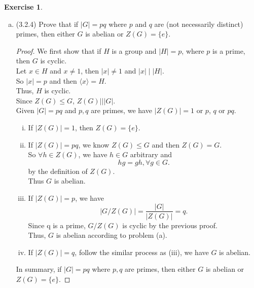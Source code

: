 \documentclass[14pt]{amsart}
\theoremstyle{plain}
\theoremstyle{definition}
\newtheorem{exer}[lem]{Exercise}
\begin{document}
\begin{exer}
\begin{enumerate}[(a)]
\item (3.2.4) Prove that if $|G|=pq$ where $p$ and $q$ are (not necessarily distinct) primes, then either $G$ is abelian or $Z(G)=\{e\}$.
  \begin{proof}
	We first show that if $H$ is a group and $|H| = p$, where $p$ is a prime, then $G$ is cyclic.\\
	Let $x \in H$ and $x \neq 1$, then $|x| \neq 1$ and $|x| \mid |H|$.\\
	So $|x| = p$ and then $\langle x\rangle = H$. \\
	Thus, $H$ is cyclic.\\
	Since $Z(G) \leq G$, $Z(G)| \mid |G|$.\\
	Given $|G| =pq$ and $p,q$ are primes, we have
	$|Z(G)| = 1$ or $p$, $q$ or $pq$.
	\begin{enumerate}[(i)]
	  \item If $|Z(G)| = 1$, then $Z(G) = \{e\}$.
	  \item If $|Z(G)| = pq$, we know $Z(G) \leq G$ and then $Z(G) = G$.\\ 
		So $\forall h\in Z(G)$, we have $h \in G$ arbitrary and  
	  	\[ hg= gh,\forall g \in G.\] 
		by the definition of $Z(G)$.\\
		Thus $G$ is abelian.
	  \item
		If $|Z(G)| = p$, we have 
		\[|G/Z(G)| = \frac{|G|}{|Z(G)|} = q.\]
		Since q is a prime, $G/Z(G)$ is cyclic by the previous proof.\\
		Thus, $G$ is abelian according to problem (a).
 	  \item 
		If $|Z(G)| = q$, follow the similar process as (iii), we have $G$ is abelian.
	\end{enumerate}
		In summary, if $|G| = pq$ where $p,q$ are primes, then either $G$ is abelian or $Z(G) = \{e\}$.

  \end{proof}

\end{enumerate}
\end{exer}
\end{document}
